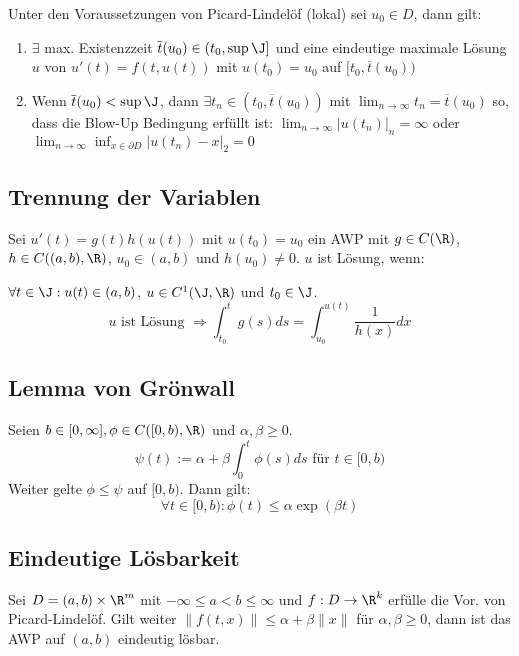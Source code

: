 Unter den Voraussetzungen von Picard-Lindelöf (lokal) sei \(u_0 \in D\), dann gilt:

\begin{enumerate}[label=(\alph*)]
	\item \(\exists\) max. Existenzzeit \(\overline t(u_0) \in (t_0, \sup \J]\) und eine eindeutige maximale Lösung \(u\) von \(u'(t) = f(t, u(t))\) mit \(u(t_0) = u_0\) auf \([t_0, \overline t(u_0))\)
	\item Wenn \(\overline t(u_0) < \sup \J\), dann \(\exists t_n \in (t_0, \overline t(u_0))\) mit \(\lim_{n \to \infty} t_n = \overline t(u_0)\) so, dass die Blow-Up Bedingung erfüllt ist: \(\lim_{n \to \infty} |u(t_n)|_n = \infty\) oder \(\lim_{n \to \infty} \inf_{x \in \partial D} |u(t_n) - x|_2 = 0\)
\end{enumerate}

\subsection*{Trennung der Variablen}

Sei \(u'(t)=g(t)h(u(t))\) mit \(u(t_0)=u_0\) ein AWP mit \(g \in C(\R)\), \(h \in C((a, b), \R)\), \(u_0 \in (a, b)\) und \(h(u_0) \neq 0\). \(u\) ist Lösung, wenn:

\(\forall t \in \J : u(t) \in (a, b)\), \(u \in C^1(\J, \R)\) und \(t_0 \in \J\).
\[ u \text{ ist Lösung } \Rightarrow \int_{t_0}^t g(s) ds = \int_{u_0}^{u(t)} \frac{1}{h(x)} dx \]

\subsection*{Lemma von Grönwall}

Seien \(b \in [0,\infty], \phi \in C([0,b),\R)\) und \(\alpha, \beta \geq 0\).
\[\psi(t) := \alpha + \beta \int_0^t \phi(s) ds \text{ für } t \in [0,b)\]
Weiter gelte \(\phi \leq \psi\) auf \([0,b)\). Dann gilt:
\[\forall t \in [0,b) : \phi(t) \leq \alpha \exp(\beta t)\]

\subsection*{Eindeutige Lösbarkeit}

Sei \(D = (a,b) \times \R^m\) mit \(-\infty \leq a < b \leq \infty\) und \(f : D \to \R^k\) erfülle die Vor. von Picard-Lindelöf. Gilt weiter \(\|f(t,x)\| \leq \alpha + \beta \|x\|\) für \(\alpha, \beta \geq 0\), dann ist das AWP auf \((a,b)\) eindeutig lösbar.
